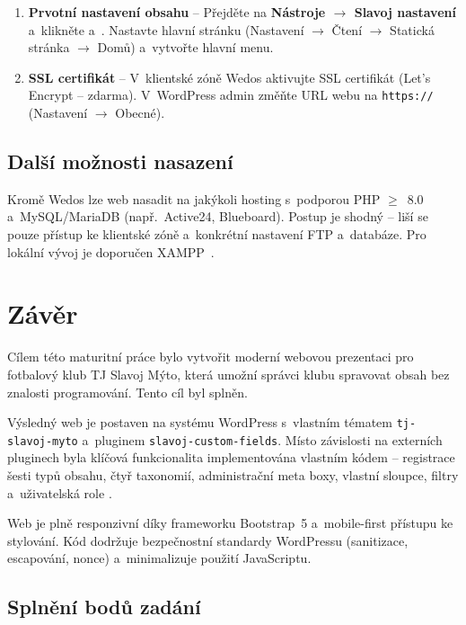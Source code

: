 \documentclass[12pt,a4paper]{article}
\begin{document}
\begin{enumerate}
    \item \textbf{Prvotní nastavení obsahu} -- Přejděte na \textbf{Nástroje $\rightarrow$ Slavoj nastavení} a~klikněte  a~. Nastavte hlavní stránku (Nastavení $\rightarrow$ Čtení $\rightarrow$ Statická stránka $\rightarrow$ Domů) a~vytvořte hlavní menu.

    \item \textbf{SSL certifikát} -- V~klientské zóně Wedos aktivujte SSL certifikát (Let's Encrypt -- zdarma). V~WordPress admin změňte URL webu na \texttt{https://} (Nastavení $\rightarrow$ Obecné).
\end{enumerate}

\subsection{Další možnosti nasazení}

Kromě Wedos lze web nasadit na jakýkoli hosting s~podporou PHP $\geq$~8.0 a~MySQL/MariaDB (např.\ Active24, Blueboard). Postup je shodný -- liší se pouze přístup ke klientské zóně a~konkrétní nastavení FTP a~databáze. Pro lokální vývoj je doporučen XAMPP~\cite{xampp}.

\clearpage
\section{Závěr}

Cílem této maturitní práce bylo vytvořit moderní webovou prezentaci pro fotbalový klub TJ Slavoj Mýto, která umožní správci klubu spravovat obsah bez znalosti programování. Tento cíl byl splněn.

Výsledný web je postaven na systému WordPress s~vlastním tématem \texttt{tj-slavoj-myto} a~pluginem \texttt{slavoj-custom-fields}. Místo závislosti na externích pluginech byla klíčová funkcionalita implementována vlastním kódem -- registrace šesti typů obsahu, čtyř taxonomií, administrační meta boxy, vlastní sloupce, filtry a~uživatelská role .

Web je plně responzivní díky frameworku Bootstrap~5 a~mobile-first přístupu ke stylování. Kód dodržuje bezpečnostní standardy WordPressu (sanitizace, escapování, nonce) a~minimalizuje použití JavaScriptu.

\subsection*{Splnění bodů zadání}
\end{document}
